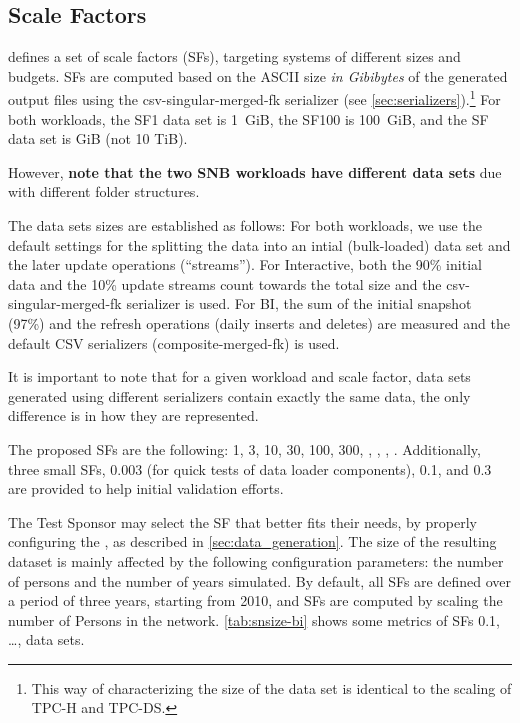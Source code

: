 \subsection{Scale Factors}
\label{sec:scale-factors}

\ldbcsnb defines a set of scale factors (SFs), targeting systems of different sizes and budgets.
SFs are computed based on the ASCII size \emph{in Gibibytes} of the generated output files using the \textsf{csv-singular-merged-fk} serializer (see \autoref{sec:serializers}).\footnote{This way of characterizing the size of the data set is identical to the scaling of TPC-H and TPC-DS.}
For both workloads, the SF1 data set is 1~GiB, the SF100 is 100~GiB, and the SF data set is  GiB (not 10 TiB).

However, \textbf{note that the two SNB workloads have different data sets} due with different folder structures.

The data sets sizes are established as follows:
For both workloads, we use the default settings for the splitting the data into an intial (bulk-loaded) data set and the later update operations (``streams'').
For Interactive, both the 90\% initial data and the 10\% update streams count towards the total size and the \textsf{csv-singular-merged-fk} serializer is used.
For BI, the sum of the initial snapshot (97\%) and the refresh operations (daily inserts and deletes) are measured and the default CSV serializers (\textsf{composite-merged-fk}) is used.

It is important to note that for a given workload and scale factor, data sets generated using different serializers contain exactly the same data, the only difference is in how they are represented.%

The proposed SFs are the following: 1, 3, 10, 30, 100, 300, , , , .
Additionally, three small SFs, 0.003 (for quick tests of data loader components), 0.1, and 0.3 are provided to help initial validation efforts.

The Test Sponsor may select the SF that better fits their needs, by properly configuring the \datagen, as described in \autoref{sec:data_generation}.
The size of the resulting dataset is mainly affected by the following configuration parameters: the number of persons and the number of years simulated.
By default, all SFs are defined over a period of three years, starting from 2010, and SFs are computed by scaling the number of Persons in the network.
\autoref{tab:snsize-bi} shows some metrics of SFs 0.1, \ldots,  data sets.

